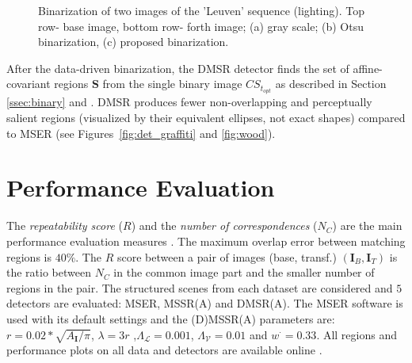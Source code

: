 \documentclass{article}
\def\I{{\mathbf I}}
\def\mcL{{\mathcal{L}}}
\def\mcV{{\mathcal{V}}}
\def\S{{\mathbf S}}
\begin{document}
\begin{figure}[htb]
 \vspace{-0.5cm}
\caption{Binarization of two images of the 'Leuven' sequence (lighting). Top row- base image, bottom row- forth image;   (a) gray scale; (b) Otsu binarization, (c) proposed binarization.}
\label{fig:leuven_bin}
%
\end{figure}

After the data-driven binarization, the DMSR detector finds the set of affine-covariant regions $\S$ from the single binary image $CS_{t_{opt}}$ as described in Section \ref{ssec:binary} and \cite{RangMSSR06, RangHumpb06}. DMSR produces fewer non-overlapping and perceptually salient regions (visualized by their equivalent ellipses, not exact shapes) compared to MSER (see Figures~\ref{fig:det_graffiti} and \ref{fig:wood}).

\section{Performance  Evaluation}
\label{sec:perf}
The {\em repeatability score} ($R$) and the {\em number of correspondences} ($N_C$) are the main performance evaluation measures \cite{Mikolajczyk:2005}. The maximum overlap error between matching regions is $40\%$. The $R$ score between a pair of images (base, transf.) $(\I_B,\I_T)$ is the ratio between $N_C$ in the common image part and the smaller number of regions in the pair. The structured scenes from each dataset are considered and $5$ detectors are evaluated: MSER, MSSR(A) and DMSR(A). The MSER software is used with its default settings and the (D)MSSR(A) parameters are: $r = 0.02*\sqrt{A_{\I} / \pi}$, $\lambda=3r$ ,$\Lambda_{\mcL}=0.001$, $\Lambda_{\mcV}=0.01$ and  $w^{\cdot}=0.33$.  
All regions and performance plots on all data and detectors are available online \cite{elena_ranguelova_2016_45156}.
\end{document}
